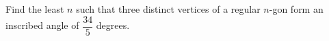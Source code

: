 Find the least $n$ such that three distinct vertices of a regular $n$-gon form an inscribed angle of $\dfrac{34}{5}$ degrees.
